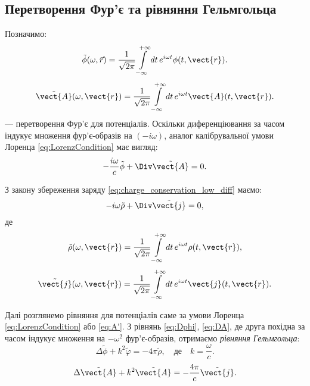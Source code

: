 \subsection*{Перетворення Фур’є та рівняння Гельмгольца}

Позначимо:
\begin{equation}\label{eq:tilde_phi}
	\tilde{\phi}(\omega, \vec{r}) = \frac{1}{\sqrt{2\pi}} \int\limits_{-\infty}^{+\infty} dt \, e^{i \omega t} \phi(t, \vect{r}).
\end{equation}
\begin{equation}\label{eq:tilde_A}
	\tilde{\vect{A}}(\omega, \vect{r}) = \frac{1}{\sqrt{2\pi}} \int\limits_{-\infty}^{+\infty} dt \, e^{i \omega t} \vect{A}(t, \vect{r}).
\end{equation}
--- перетворення Фур’є для потенціалів.
Оскільки диференціювання за часом індукує множення фур’є-образів на \((-i \omega)\), аналог калібрувальної умови Лоренца \eqref{eq:LorenzCondition} має
вигляд:
\begin{equation}
	-\frac{i \omega}{c} \tilde{\phi} + \Div \tilde{\vect{A}} = 0.
\end{equation}

З закону збереження заряду \eqref{eq:charge_conservation_low_diff} маємо:
\begin{equation}
	-i \omega \tilde{\rho} + \Div \tilde{\vect{j}} = 0,
\end{equation}
де
\begin{equation}
	\tilde{\rho}(\omega, \vect{r}) = \frac{1}{\sqrt{2\pi}} \int\limits_{-\infty}^{+\infty} dt \, e^{i \omega t} \rho(t, \vect{r}),
\end{equation}
\begin{equation}
	\tilde{\vect{j}}(\omega, \vect{r}) = \frac{1}{\sqrt{2\pi}} \int\limits_{-\infty}^{+\infty} dt \, e^{i \omega t} \vect{j}(t, \vect{r}).
\end{equation}

Далі розглянемо рівняння для потенціалів саме за умови Лоренца \eqref{eq:LorenzCondition} або \eqref{eq:A'}. З рівнянь \eqref{eq:Dphi}, \eqref{eq:DA},
де друга похідна за часом індукує множення на \( -\omega^2 \) фур’є-образів, отримаємо \emph{рівняння Гельмгольца}:
\begin{equation}\label{eq:Dphi_Fourier}
	\Delta \tilde{\phi} + k^2 \tilde{\varphi} = -4\pi \tilde{\rho}, \quad \text{де} \quad k = \frac{\omega}{c}.
\end{equation}
\begin{equation}\label{eq:DA_Fourier}
	\Delta \tilde{\vect{A}} + k^2 \tilde{\vect{A}} = -\frac{4\pi}{c} \tilde{\vect{j}}.
\end{equation}



